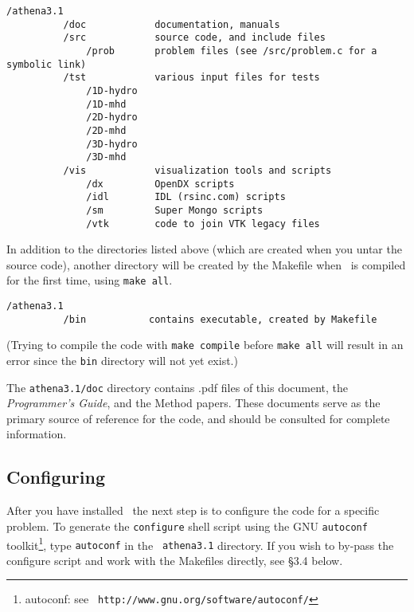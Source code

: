 \begin{verbatim}
/athena3.1
          /doc            documentation, manuals
          /src            source code, and include files
              /prob       problem files (see /src/problem.c for a symbolic link)
          /tst            various input files for tests
              /1D-hydro
              /1D-mhd
              /2D-hydro
              /2D-mhd
              /3D-hydro
              /3D-mhd
          /vis            visualization tools and scripts
              /dx         OpenDX scripts
              /idl        IDL (rsinc.com) scripts
              /sm         Super Mongo scripts
              /vtk        code to join VTK legacy files
\end{verbatim}
In addition to the directories listed above (which are created when you
untar the source code), another directory will be created by the Makefile
when \ath\ is compiled for the first time, using {\tt make all}.

\begin{verbatim}
/athena3.1
          /bin           contains executable, created by Makefile
\end{verbatim}
(Trying to compile the code with {\tt make compile} before
{\tt make all} will result in an error since the {\tt bin} directory will
not yet exist.)

The {\tt athena3.1/doc} directory contains .pdf files of this document,
the {\em Programmer's Guide}, and the Method papers.  These documents serve as
the primary source of reference for the code, and should be consulted for
complete information.

\subsection{Configuring \ath}

After you have installed \ath\, the next step is to configure the
code for a specific problem.  To generate the {\tt configure} shell
script using the GNU {\tt autoconf} toolkit\footnote{autoconf: see {\tt
http://www.gnu.org/software/autoconf/}}, type {\tt autoconf} in the {\tt
athena3.1} directory.  If you wish to by-pass the configure script and work
with the Makefiles directly, see \S 3.4 below.

